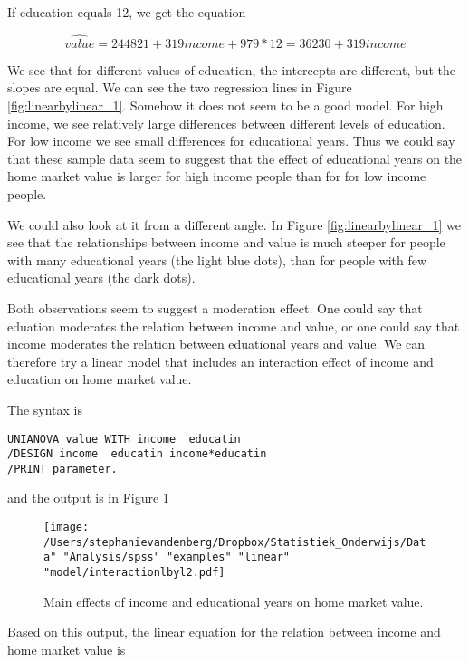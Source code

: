 If education equals 12, we get the equation 

\begin{equation}
\widehat{value}= 244821 + 319 income + 979 * 12 = 36230 + 319 income
\end{equation}

We see that for different values of education, the intercepts are different, but the slopes are equal. We can see the two regression lines in Figure \ref{fig:linearbylinear_1}. Somehow it does not seem to be a good model. For high income, we see relatively large differences between different levels of education. For low income we see small differences for educational years. Thus we could say that these sample data seem to suggest that the effect of educational years on the home market value is larger for high income people than for for low income people.

We could also look at it from a different angle. In Figure \ref{fig:linearbylinear_1} we see that the relationships between income and value is much steeper for people with many educational years (the light blue dots), than for people with few educational years (the dark dots).

Both observations seem to suggest a moderation effect. One could say that eduation moderates the relation between income and value, or one could say that income moderates the relation between eduational years and value. We can therefore try a linear model that includes an interaction effect of income and education on home market value. 

The syntax is 

\begin{verbatim}
UNIANOVA value WITH income  educatin
/DESIGN income  educatin income*educatin
/PRINT parameter.
\end{verbatim}

and the output is in Figure \ref{fig:interactionlbyl2}

\begin{figure}[h]
    \begin{center}
       \texttt{[image: /Users/stephanievandenberg/Dropbox/Statistiek\_Onderwijs/Data" "Analysis/spss" "examples"  "linear" "model/interactionlbyl2.pdf]}
    \end{center}
    \label{fig:interactionlbyl2}
    \caption{Main effects of income and educational years on home market value.}
\end{figure}

Based on this output, the linear equation for the relation between income and home market value is 

